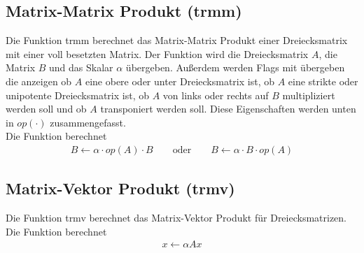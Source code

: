 \subsection{Matrix-Matrix Produkt (trmm)}
Die Funktion \glqq trmm\grqq{} berechnet das Matrix-Matrix Produkt einer Dreiecksmatrix mit einer voll besetzten Matrix.
Der Funktion wird die Dreiecksmatrix $A$, die Matrix $B$ und das Skalar $\alpha$ übergeben. Außerdem werden Flags mit übergeben die anzeigen ob $A$ eine obere oder unter Dreiecksmatrix ist, ob $A$ eine strikte oder unipotente Dreiecksmatrix ist, ob $A$ von links oder rechts auf $B$ multipliziert werden soll und ob $A$ transponiert werden soll. Diese Eigenschaften werden unten in $op(\cdot)$ zusammengefasst. \\
Die Funktion berechnet
\begin{align}
B \leftarrow  \alpha \cdot op(A) \cdot B \qquad \text{oder} \qquad B \leftarrow  \alpha \cdot B \cdot op(A)
\end{align}
\subsection{Matrix-Vektor Produkt (trmv)}
Die Funktion \glqq trmv\grqq{} berechnet das Matrix-Vektor Produkt für Dreiecksmatrizen.
Die Funktion berechnet
\begin{align}
x \leftarrow \alpha  Ax %
\end{align}

